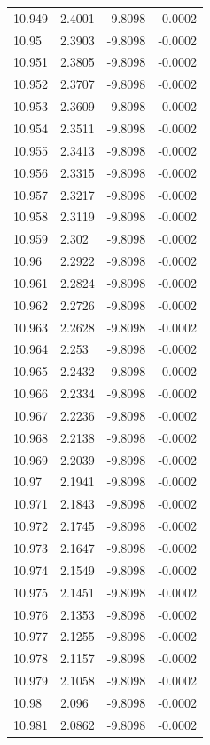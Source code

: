 \begin{tabular}{llll}
10.949 & 2.4001 & -9.8098 & -0.0002 \\
10.95 & 2.3903 & -9.8098 & -0.0002 \\
10.951 & 2.3805 & -9.8098 & -0.0002 \\
10.952 & 2.3707 & -9.8098 & -0.0002 \\
10.953 & 2.3609 & -9.8098 & -0.0002 \\
10.954 & 2.3511 & -9.8098 & -0.0002 \\
10.955 & 2.3413 & -9.8098 & -0.0002 \\
10.956 & 2.3315 & -9.8098 & -0.0002 \\
10.957 & 2.3217 & -9.8098 & -0.0002 \\
10.958 & 2.3119 & -9.8098 & -0.0002 \\
10.959 & 2.302 & -9.8098 & -0.0002 \\
10.96 & 2.2922 & -9.8098 & -0.0002 \\
10.961 & 2.2824 & -9.8098 & -0.0002 \\
10.962 & 2.2726 & -9.8098 & -0.0002 \\
10.963 & 2.2628 & -9.8098 & -0.0002 \\
10.964 & 2.253 & -9.8098 & -0.0002 \\
10.965 & 2.2432 & -9.8098 & -0.0002 \\
10.966 & 2.2334 & -9.8098 & -0.0002 \\
10.967 & 2.2236 & -9.8098 & -0.0002 \\
10.968 & 2.2138 & -9.8098 & -0.0002 \\
10.969 & 2.2039 & -9.8098 & -0.0002 \\
10.97 & 2.1941 & -9.8098 & -0.0002 \\
10.971 & 2.1843 & -9.8098 & -0.0002 \\
10.972 & 2.1745 & -9.8098 & -0.0002 \\
10.973 & 2.1647 & -9.8098 & -0.0002 \\
10.974 & 2.1549 & -9.8098 & -0.0002 \\
10.975 & 2.1451 & -9.8098 & -0.0002 \\
10.976 & 2.1353 & -9.8098 & -0.0002 \\
10.977 & 2.1255 & -9.8098 & -0.0002 \\
10.978 & 2.1157 & -9.8098 & -0.0002 \\
10.979 & 2.1058 & -9.8098 & -0.0002 \\
10.98 & 2.096 & -9.8098 & -0.0002 \\
10.981 & 2.0862 & -9.8098 & -0.0002 \\

\end{tabular}
